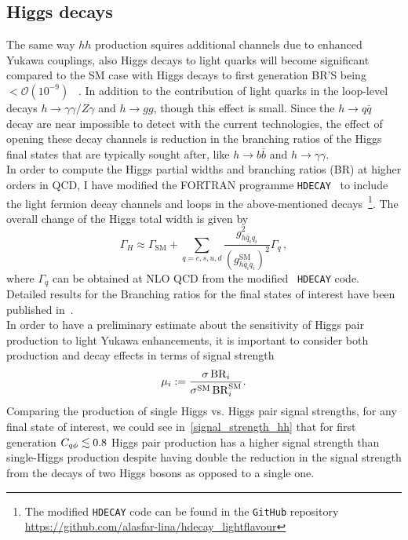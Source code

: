 \subsection{Higgs decays \label{sec:Hdecay}}
The same way $hh$ production squires additional channels due to enhanced Yukawa couplings, also Higgs decays to light quarks will become significant compared to the SM case with Higgs decays to first generation BR'S being $<\mathcal{O}(10^{-9})$ ~\cite{deFlorian:2016spz}.  In addition to the contribution of light quarks in the loop-level decays $h \to \gamma \gamma/Z \gamma$ and $ h \to gg$, though this effect is small.  Since the $ h \to q\bar q$ decay are near impossible to detect with the current technologies, the effect of opening these decay channels is reduction in the branching ratios of the Higgs final states that are typically sought after, like $ h \to b \bar b $ and $ h \to \gamma \gamma$. \\ In order to compute the Higgs partial widths and branching ratios (BR) at higher orders in QCD, I have modified the FORTRAN programme \texttt{HDECAY}~\cite{Djouadi:1997yw,Djouadi:2018xqq} to include the light fermion decay channels and loops in the above-mentioned decays~\footnote{The modified \texttt{HDECAY} code can be found in the \texttt{GitHub} repository \url{https://github.com/alasfar-lina/hdecay_lightflavour}}. The overall change of the Higgs total width is given by
\begin{equation}
	\Gamma_H \approx \Gamma_{\text{SM}}+\sum_{q=c,s,u,d}\frac{g_{h \bar{q}_i q_i}^2}{(g_{h \bar{q}_i q_i}^{\text{SM}})^2}\Gamma_{q}\,,
\end{equation}
where $\Gamma_q$ can be obtained at NLO QCD from the modified ~\texttt{HDECAY} code. Detailed results for the Branching ratios for the final states of interest have been published in~\cite{Alasfar:2019pmn}.\\ 
In order to have a preliminary estimate about the sensitivity of Higgs pair production to light Yukawa enhancements, it is important to consider both production and decay effects in terms of signal strength
\begin{equation}
	\mu_i : = \frac{\sigma \, {\rm BR}_i } {\sigma^{\mathrm{SM}} \, {\rm BR}_i^{\mathrm{SM}}}.
\end{equation}
Comparing the production of single Higgs vs. Higgs pair signal strengths, for any final state of interest, we could see in~\autoref{signal_strength_hh} that for  first generation $C_{q \phi} \lesssim 0.8$ Higgs pair production has a higher signal strength than single-Higgs production despite having double the reduction in the signal strength from the decays of two Higgs bosons as opposed to a single one. 
